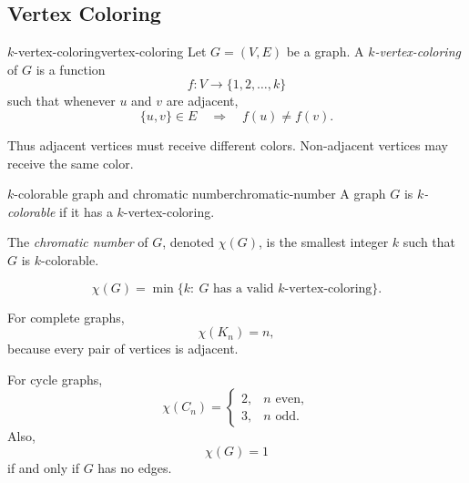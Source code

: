 \subsection{Vertex Coloring}

\begin{definition}{\(k\)-vertex-coloring}{vertex-coloring}
Let \(G=(V,E)\) be a graph. A \emph{\(k\)-vertex-coloring} of \(G\) is a function
\[
f:V\to \{1,2,\dots,k\}
\]
such that whenever \(u\) and \(v\) are adjacent,
\[
\{u,v\}\in E
\quad\Longrightarrow\quad
f(u)\neq f(v).
\]
\end{definition}

Thus adjacent vertices must receive different colors. Non-adjacent vertices may receive the same color.

\begin{definition}{\(k\)-colorable graph and chromatic number}{chromatic-number}
A graph \(G\) is \emph{\(k\)-colorable} if it has a \(k\)-vertex-coloring.

The \emph{chromatic number} of \(G\), denoted \(\chi(G)\), is the smallest integer \(k\) such that \(G\) is \(k\)-colorable.
\end{definition}

\begin{keyformula}[title={Meaning of chromatic number}]
\[
\chi(G)=\min\{k:\ G\text{ has a valid }k\text{-vertex-coloring}\}.
\]
\end{keyformula}

\begin{center}
\end{center}

\begin{examplebox}[title={Basic chromatic numbers}]
For complete graphs,
\[
\chi(K_n)=n,
\]
because every pair of vertices is adjacent.

For cycle graphs,
\[
\chi(C_n)=
\begin{cases}
2, & n\text{ even},\\
3, & n\text{ odd}.
\end{cases}
\]
Also,
\[
\chi(G)=1
\]
if and only if \(G\) has no edges.
\end{examplebox}


